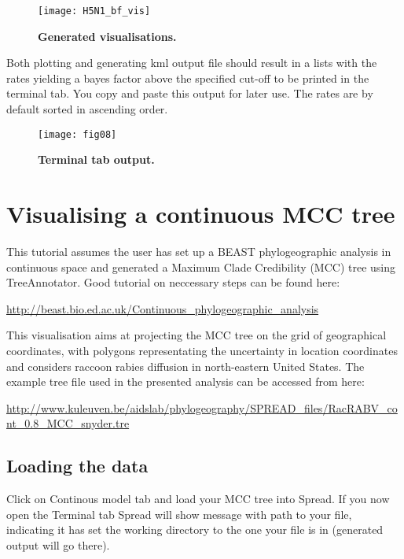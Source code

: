 \begin{figure}[h!]
\begin{centering}
\texttt{[image: H5N1\_bf\_vis]}
\caption{
{ \footnotesize 
{\bf Generated visualisations.}
} %
}
\label{fig:07}
\par\end{centering}
\end{figure}

Both plotting and generating kml output file should result in a lists
with the rates yielding a bayes factor above the specified cut-off
to be printed in the terminal tab. You copy and paste this output
for later use. The rates are by default sorted in ascending order.


\begin{figure}[h!]
\begin{centering}
\texttt{[image: fig08]}
\caption{
{ \footnotesize 
{\bf Terminal tab output.}
} %
}
\label{fig:08}
\par\end{centering}
\end{figure}

\section{Visualising a continuous MCC tree}

This tutorial assumes the user has set up a BEAST phylogeographic
analysis in continuous space and generated a Maximum Clade Credibility
(MCC) tree using TreeAnnotator. Good tutorial on neccessary steps
can be found here:

\url{http://beast.bio.ed.ac.uk/Continuous_phylogeographic_analysis}

\noindent
This visualisation aims at projecting the MCC tree on the grid of
geographical coordinates, with polygons representating the uncertainty
in location coordinates and considers raccoon rabies diffusion in
north-eastern United States. 
The example tree file used in the presented analysis can be accessed
from here:

\url{http://www.kuleuven.be/aidslab/phylogeography/SPREAD_files/RacRABV_cont_0.8_MCC_snyder.tre}


\subsection{Loading the data}

Click on Continous model tab and load your MCC tree into Spread. If
you now open the Terminal tab Spread will show message with path to
your file, indicating it has set the working directory to the one
your file is in (generated output will go there).

